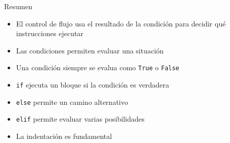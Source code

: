 \documentclass{beamer}
\begin{document}

    \begin{frame}[fragile,t]{Resumen}
        \begin{itemize}
            \item El control de flujo usa el resultado de la condición para decidir qué instrucciones ejecutar
            \item Las condiciones permiten evaluar una situación
            \item Una condición siempre se evalua como \texttt{True} o \texttt{False}
            \item \texttt{if} ejecuta un bloque si la condición es verdadera
            \item \texttt{else} permite un camino alternativo
            \item \texttt{elif} permite evaluar varias posibilidades
            \item La indentación es fundamental
        \end{itemize}
    \end{frame}
    
\end{document}
